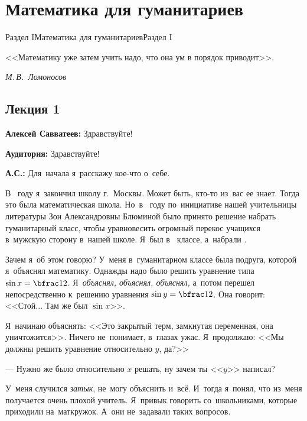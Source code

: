 \chapter{Математика для гуманитариев}{Раздел I}{Математика для гуманитариев}{Раздел I}

{\small
<<Математику уже затем учить надо, что она ум в порядок приводит>>.


\begin{flushright}
\textit{М.\,В.~Ломоносов}
\end{flushright}


}

\thispagestyle{empty}

\newpage



\section{Лекция 1}
\label{1.1}

\textbf{Алексей Савватеев:} Здравствуйте!

\textbf{Аудитория:} Здравствуйте!

\textbf{А.С.:} Для~начала я~расскажу кое-что о~себе.

В~ году я~закончил  школу г.~Москвы. Может быть, кто-то из~вас ее знает.
Тогда это была математическая школа. Но~в~ году по~инициативе нашей учительницы литературы Зои
Александровны Блюминой было принято решение набрать гуманитарный класс, чтобы уравновесить огромный
перекос учащихся в~мужскую сторону в~нашей школе. Я~был в~ классе, а~набрали .

Зачем я~об этом говорю? У~меня в~гуманитарном классе была подруга, которой я~объяснял математику.
Однажды надо было решить уравнение типа $\sin x=\bfrac12$. Я~\textit{объяснял, объяснял, объяснял,} а~потом
перешел непосредственно к~решению уравнения $\sin y=\bfrac12$. Она говорит: <<Стой... Там же был $\sin x$>>.

Я~начинаю объяснять: <<Это закрытый терм, замкнутая переменная, она уничтожится>>.
Ничего
не~понимает, в~глазах ужас. Я~продолжаю: <<Мы должны решить уравнение относительно $y$, да?>>

--- Нужно же было относительно $x$ решать, ну зачем ты <<$y$>> написал?

У~меня случился \textit{затык}, не~могу объяснить и~всё. И~тогда я~понял, что из~меня получается
очень плохой учитель. Я~привык говорить со~школьниками, которые приходили на~маткружок. А~они
не~задавали таких вопросов.

